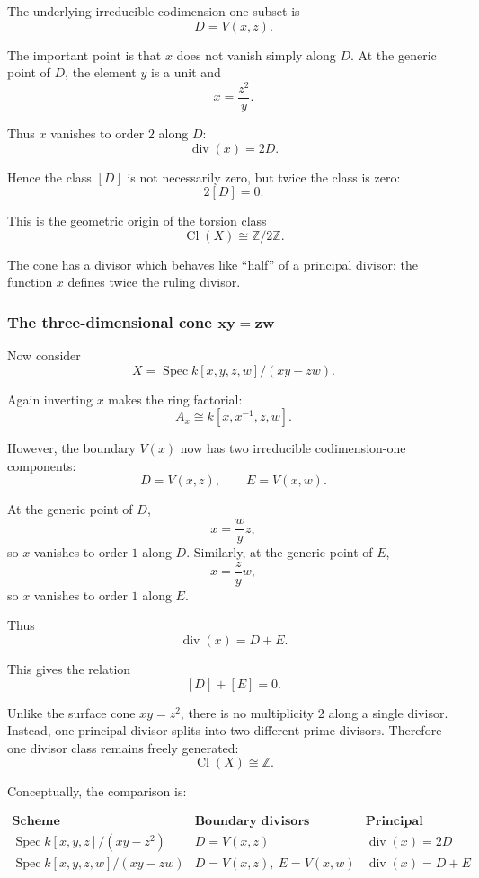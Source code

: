 \documentclass[12pt,a4paper]{article}
\DeclareMathOperator{\Spec}{Spec}
\newcommand{\divisor}{\operatorname{div}}
\newcommand{\Z}{\mathbb{Z}}
\newcommand{\Cl}{\operatorname{Cl}}
\providecommand{\Spec}{\operatorname{Spec}}
\theoremstyle{notespace}
\begin{document}
The underlying irreducible codimension-one subset is
\[
D=V(x,z).
\]

The important point is that \(x\) does not vanish simply along \(D\). At the generic point of \(D\), the element \(y\) is a unit and
\[
x=\frac{z^2}{y}.
\]

Thus \(x\) vanishes to order \(2\) along \(D\):
\[
\divisor(x)=2D.
\]

Hence the class \([D]\) is not necessarily zero, but twice the class is zero:
\[
2[D]=0.
\]

This is the geometric origin of the torsion class
\[
\Cl(X)\cong \Z/2\Z.
\]

The cone has a divisor which behaves like ``half'' of a principal divisor: the function \(x\) defines twice the ruling divisor.

\subsubsection{The three-dimensional cone \(\boldsymbol{xy=zw}\)}

Now consider
\[
X=\Spec k[x,y,z,w]/(xy-zw).
\]

Again inverting \(x\) makes the ring factorial:
\[
A_x\cong k[x,x^{-1},z,w].
\]

However, the boundary \(V(x)\) now has two irreducible codimension-one components:
\[
D=V(x,z),
\qquad
E=V(x,w).
\]

At the generic point of \(D\),
\[
x=\frac{w}{y}z,
\]
so \(x\) vanishes to order \(1\) along \(D\). Similarly, at the generic point of \(E\),
\[
x=\frac{z}{y}w,
\]
so \(x\) vanishes to order \(1\) along \(E\).

Thus
\[
\divisor(x)=D+E.
\]

This gives the relation
\[
[D]+[E]=0.
\]

Unlike the surface cone \(xy=z^2\), there is no multiplicity \(2\) along a single divisor. Instead, one principal divisor splits into two different prime divisors. Therefore one divisor class remains freely generated:
\[
\Cl(X)\cong \Z.
\]

Conceptually, the comparison is:

\[
\begin{array}{c|c|c}
	\textbf{Scheme} & \textbf{Boundary divisors} & \textbf{Principal relation} \\
	\hline
	\Spec k[x,y,z]/(xy-z^2)
	&
	D=V(x,z)
	&
	\divisor(x)=2D
	\\[4pt]
	\Spec k[x,y,z,w]/(xy-zw)
	&
	D=V(x,z),\ E=V(x,w)
	&
	\divisor(x)=D+E
\end{array}
\]
\end{document}

